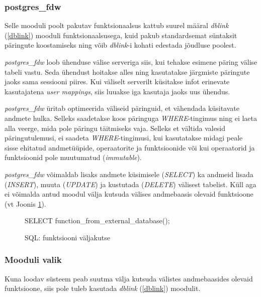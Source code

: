 \documentclass[a4paper,12pt]{article} %
\begin{document}
\subsubsection{postgres\_fdw}
Selle mooduli poolt pakutav funktsionaalsus kattub suurel määral \textit{dblink} (\ref{dblink}) mooduli funktsionaalsusega, kuid pakub standardsemat süntaksit päringute koostamiseks ning võib \textit{dblink}-i kohati edestada jõudluse poolest.\par
\textit{postgres\_fdw} loob ühenduse välise serveriga siis, kui tehakse esimene päring välise tabeli vastu. Seda ühendust hoitakse alles ning kasutatakse järgmiste päringute jaoks sama sessiooni piires. Kui väliselt serverilt küsitakse infot erinevate kasutajatena \textit{user mappings}, siis luuakse iga kasutaja jaoks uus ühendus.\par
\textit{postgres\_fdw} üritab optimeerida väliseid päringuid, et vähendada küsitavate andmete hulka. Selleks saadetakse koos päringuga \textit{WHERE}-tingimus ning ei laeta alla veerge, mida pole päringu täitmiseks vaja. Selleks et vältida valesid päringutulemusi, ei saadeta \textit{WHERE}-tingimusi, kui kasutatakse midagi peale sisse ehitatud andmetüüpide, operaatorite ja funktsioonide või kui operaatorid ja funktsioonid pole muutumatud (\textit{immutable}). \cite{PostgreSQLfdw}\par
\textit{postgres\_fdw} võimaldab lisaks andmete küsimisele (\textit{SELECT}) ka andmeid lisada (\textit{INSERT}), muuta (\textit{UPDATE}) ja kustutada (\textit{DELETE}) välisest tabelist. Küll aga ei võimalda antud moodul välja kutsuda välises andmebaasis olevaid funktsioone (vt Joonis \ref{fig_sql_funktsiooni_väljakutse}).
\begin{figure}[H]
\centering
\begin{SQL}
SELECT function_from_external_database();
\end{SQL}
\caption{SQL: funktsiooni väljakutse}
\label{fig_sql_funktsiooni_väljakutse}
\end{figure}

\subsubsection{Mooduli valik}
Kuna loodav süsteem peab suutma välja kutsuda välistes andmebaasides olevaid funktsioone, siis pole tuleb kasutada \textit{dblink} (\ref{dblink}) moodulit.
\end{document}
